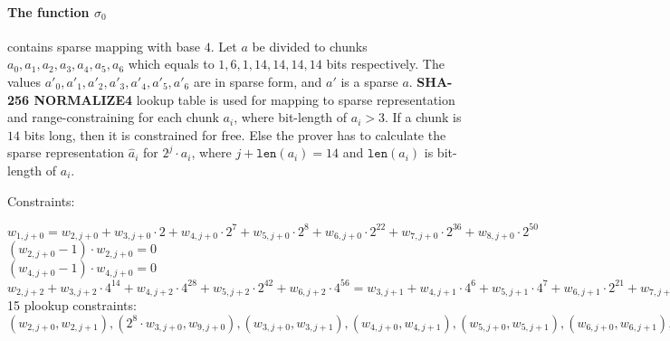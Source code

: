 \paragraph{The function $\sigma_0$} contains sparse mapping with base $4$.
Let $a$ be divided to chunks $a_0, a_1, a_2, a_3, a_4, a_5, a_6$ which equals to $1, 6, 1, 14, 14, 14, 14$ bits respectively.
The values $a'_0, a'_1, a'_2, a'_3, a'_4, a'_5, a'_6$ are in sparse form, and $a'$ is a sparse $a$.
\textbf{SHA-256 NORMALIZE4} lookup table is used for mapping to sparse representation and range-constraining for each chunk $a_i$, where bit-length of $a_i > 3$.
If a chunk is $14$ bits long, then it is constrained for free.
Else the prover has to calculate the sparse representation $\hat{a}_i$ for $2^j \cdot a_i$, where $j + \texttt{len}(a_i) = 14$ and $\texttt{len}(a_i)$ is bit-length of $a_i$.

Constraints:
\begin{center}
    $w_{1, j + 0} = w_{2, j + 0} + w_{3,j + 0} \cdot 2 + w_{4,j + 0} \cdot 2^{7} + w_{5, j + 0} \cdot 2^{8} + w_{6, j + 0} \cdot 2^{22} + w_{7,  j + 0}\cdot 2^{36} + w_{8, j + 0} \cdot 2^{50}$ \\
    $(w_{2, j + 0} - 1) \cdot w_{2, j + 0} = 0$ \\
    $(w_{4, j + 0} - 1) \cdot w_{4, j + 0} = 0$ \\
    $w_{2, j + 2} + w_{3, j + 2} \cdot 4^{14} + w_{4, j + 2} \cdot 4^{28} + w_{5, j + 2} \cdot 2^{42} + w_{6, j + 2} \cdot 4^{56} = w_{3, j + 1} + w_{4, j + 1} \cdot 4^6 + w_{5, j + 1} \cdot 4^{7} + w_{6, j + 1} \cdot 2^{21} + w_{7, j + 1} \cdot 4^{35} + w_{8, j + 1} \cdot 4^{49} + w_{2, j + 1} \cdot 4^{63} + 
     w_{4, j + 1} + w_{5, j + 1} \cdot 4 + w_{6, j + 1} \cdot 4^{15} + w_{7, j + 1} \cdot 2^{29} + w_{8, j + 1} \cdot 4^{43} + 
     w_{5, j + 1} + w_{6, j + 1} \cdot 4^{14} + w_{7, j + 1} \cdot 4^{28} + w_{8, j + 1} \cdot 2^{42} + w_{2, j + 1} \cdot 4^{56} + w_{3, j + 1} \cdot 4^{57} + w_{4, j + 1} \cdot 4^{63}$ \\
    15 plookup constraints: $(w_{2, j + 0}, w_{2, j + 1}), ( 2^{8} \cdot w_{3, j + 0}, w_{9, j + 0}), (w_{3, j + 0}, w_{3, j + 1}), (w_{4, j + 0}, w_{4, j + 1}), (w_{5, j + 0}, w_{5, j + 1}), (w_{6, j + 0}, w_{6, j + 1}),  (w_{7, j + 0}, w_{7, j + 1}),  (w_{8, j + 0}, w_{8, j + 1}), (w_{2, j + 3}, w_{2, j + 2}), (w_{3, j + 3}, w_{3, j + 2}), (w_{4, j + 3}, w_{4, j + 2}), (w_{5, j + 3}, w_{5, j + 2}), (w_{6, j + 3}, w_{6, j + 2}), (2^6 \cdot w_{6, j + 3}, w_{7, j + 2})$
\end{center}

